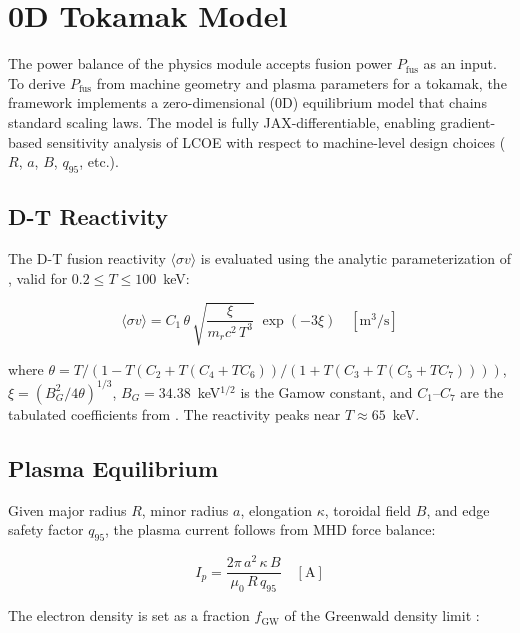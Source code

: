 \documentclass{article}
\begin{document}
\section{0D Tokamak Model}
\label{sec:tokamak-model}

The power balance of the physics module accepts fusion power
$P_{\text{fus}}$ as an input. To derive $P_{\text{fus}}$ from machine
geometry and plasma parameters for a tokamak, the framework implements a
zero-dimensional (0D) equilibrium model that chains standard scaling
laws. The model is fully JAX-differentiable, enabling gradient-based
sensitivity analysis of LCOE with respect to machine-level design
choices ($R$, $a$, $B$, $q_{95}$, etc.).

\subsection{D-T Reactivity}

The D-T fusion reactivity $\langle\sigma v\rangle$ is evaluated using
the analytic parameterization of \citet{boschhale1992}, valid for
$0.2 \leq T \leq 100$~keV:

\begin{equation}
\label{eq:sigma-v}
\langle\sigma v\rangle = C_1\,\theta\,
  \sqrt{\frac{\xi}{m_r c^2\,T^3}}\;\exp(-3\xi)
  \quad [\text{m}^3/\text{s}]
\end{equation}

\noindent where $\theta = T / (1 - T(C_2 + T(C_4 + TC_6))/(1 + T(C_3 + T(C_5 + TC_7))))$,
$\xi = (B_G^2 / 4\theta)^{1/3}$, $B_G = 34.38$~keV$^{1/2}$ is the
Gamow constant, and $C_1$--$C_7$ are the tabulated coefficients from
\citet{boschhale1992}. The reactivity peaks near $T \approx 65$~keV.

\subsection{Plasma Equilibrium}

Given major radius $R$, minor radius $a$, elongation $\kappa$,
toroidal field $B$, and edge safety factor $q_{95}$, the plasma
current follows from MHD force balance:

\begin{equation}
\label{eq:ip}
I_p = \frac{2\pi\,a^2\,\kappa\,B}{\mu_0\,R\,q_{95}}
  \quad [\text{A}]
\end{equation}

The electron density is set as a fraction $f_{\text{GW}}$ of the
Greenwald density limit \citep{iterphysics1999}:
\end{document}
